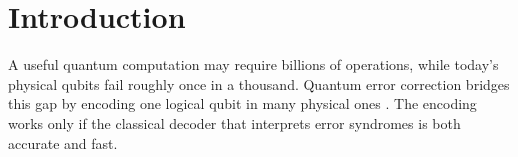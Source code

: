 \chapter{Introduction}
\label{ch:introduction}

A useful quantum computation may require billions of operations, while today's physical qubits
fail roughly once in a thousand. Quantum error correction bridges this gap by encoding one
logical qubit in many physical ones \citep{fowler2012}. The encoding works only if the classical
decoder that interprets error syndromes is both accurate and fast.
